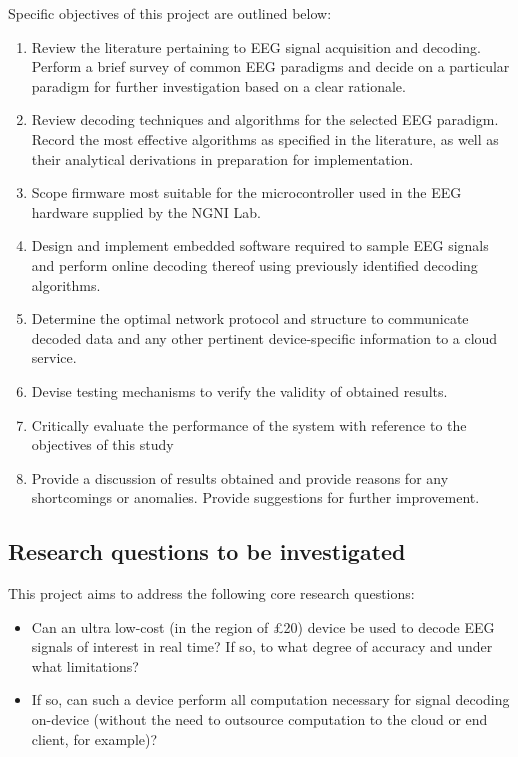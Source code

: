 Specific objectives of this project are outlined below:
\begin{enumerate}
    \item Review the literature pertaining to EEG signal acquisition and decoding. Perform a brief survey of common EEG paradigms and decide on a particular paradigm for further investigation based on a clear rationale. 
    \item Review decoding techniques and algorithms for the selected EEG paradigm. Record the most effective algorithms as specified in the literature, as well as their analytical derivations in preparation for implementation. 
    \item Scope firmware most suitable for the microcontroller used in the EEG hardware supplied by the NGNI Lab.
    \item Design and implement embedded software required to sample EEG signals and perform online decoding thereof using previously identified decoding algorithms.
    \item Determine the optimal network protocol and structure to communicate decoded data and any other pertinent device-specific information to a cloud service.
    \item Devise testing mechanisms to verify the validity of obtained results.
    \item Critically evaluate the performance of the system with reference to the objectives of this study 
    \item Provide a discussion of results obtained and provide reasons for any shortcomings or anomalies. Provide suggestions for further improvement.
    
\end{enumerate}


\subsection{Research questions to be investigated}
This project aims to address the following core research questions: 
\begin{itemize}
    \item Can an ultra low-cost (in the region of £20) device be used to decode EEG signals of interest in real time? If so, to what degree of accuracy and under what limitations?
    \item If so, can such a device perform all computation necessary for signal decoding on-device (without the need to outsource computation to the cloud or end client, for example)? 
\end{itemize}
